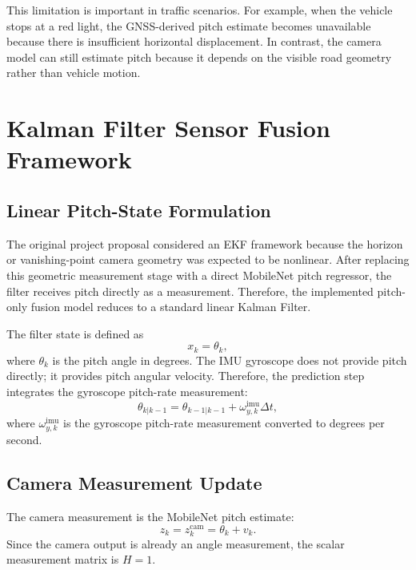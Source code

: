 \documentclass[conference]{IEEEtran}
\begin{document}
This limitation is important in traffic scenarios. For example, when the vehicle stops at a red light, the GNSS-derived pitch estimate becomes unavailable because there is insufficient horizontal displacement. In contrast, the camera model can still estimate pitch because it depends on the visible road geometry rather than vehicle motion.



\section{Kalman Filter Sensor Fusion Framework}

\subsection{Linear Pitch-State Formulation}
The original project proposal considered an EKF framework because the horizon or vanishing-point camera geometry was expected to be nonlinear. After replacing this geometric measurement stage with a direct MobileNet pitch regressor, the filter receives pitch directly as a measurement. Therefore, the implemented pitch-only fusion model reduces to a standard linear Kalman Filter.

The filter state is defined as
\begin{equation}
    x_k = \theta_k,
    \label{eq:kf_state}
\end{equation}
where $\theta_k$ is the pitch angle in degrees. The IMU gyroscope does not provide pitch directly; it provides pitch angular velocity. Therefore, the prediction step integrates the gyroscope pitch-rate measurement:
\begin{equation}
    \theta_{k|k-1} =
    \theta_{k-1|k-1} + \omega^{\mathrm{imu}}_{y,k}\Delta t,
    \label{eq:kf_prediction}
\end{equation}
where $\omega^{\mathrm{imu}}_{y,k}$ is the gyroscope pitch-rate measurement converted to degrees per second.

\subsection{Camera Measurement Update}
The camera measurement is the MobileNet pitch estimate:
\begin{equation}
    z_k = z^{\mathrm{cam}}_k = \theta_k + v_k.
    \label{eq:kf_measurement}
\end{equation}
Since the camera output is already an angle measurement, the scalar measurement matrix is $H=1$.
\end{document}
